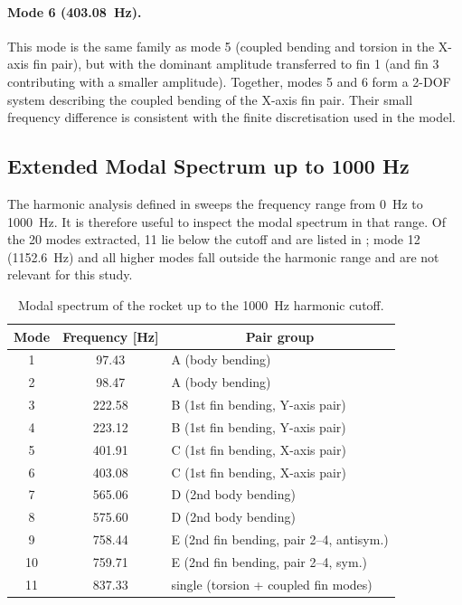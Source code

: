 \paragraph{Mode 6 (\SI{403.08}{\hertz}).} This mode is the same family as mode 5 (coupled bending and torsion in the X-axis fin pair), but with the dominant amplitude transferred to fin 1 (and fin 3 contributing with a smaller amplitude). Together, modes 5 and 6 form a 2-DOF system describing the coupled bending of the X-axis fin pair. Their small frequency difference is consistent with the finite discretisation used in the model.

\subsection{Extended Modal Spectrum up to 1000 Hz}

The harmonic analysis defined in  sweeps the frequency range from \SI{0}{\hertz} to \SI{1000}{\hertz}. It is therefore useful to inspect the modal spectrum in that range. Of the 20 modes extracted, 11 lie below the cutoff and are listed in ; mode 12 (\SI{1152.6}{\hertz}) and all higher modes fall outside the harmonic range and are not relevant for this study.

\begin{table}[H]
\centering
\caption{Modal spectrum of the rocket up to the \SI{1000}{\hertz} harmonic cutoff.}
\label{tab:extended_modes}
\small
\begin{tabular}{c c p{8cm}}
\toprule
\multicolumn{1}{c}{Mode} & \multicolumn{1}{c}{Frequency [\si{\hertz}]} & \multicolumn{1}{c}{Pair group} \\
\midrule
1  &  97.43 & A (body bending) \\
2  &  98.47 & A (body bending) \\
3  & 222.58 & B (1st fin bending, Y-axis pair) \\
4  & 223.12 & B (1st fin bending, Y-axis pair) \\
5  & 401.91 & C (1st fin bending, X-axis pair) \\
6  & 403.08 & C (1st fin bending, X-axis pair) \\
7  & 565.06 & D (2nd body bending) \\
8  & 575.60 & D (2nd body bending) \\
9  & 758.44 & E (2nd fin bending, pair 2--4, antisym.) \\
10 & 759.71 & E (2nd fin bending, pair 2--4, sym.) \\
11 & 837.33 & single (torsion + coupled fin modes) \\
\bottomrule
\end{tabular}
\end{table}

